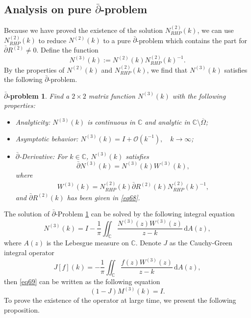 \documentclass[11pt]{article}
\numberwithin{equation}{section}
\newtheorem{dbar}{$\bar{\partial}$-problem}
\begin{document}
\subsection{\texorpdfstring{Analysis on pure $\bar{\partial}$-problem}{Analysis on pure dbar-problem}}\label{sec4.4}
Because we have proved the existence of the solution  $N^{(2)}_{RHP}(k)$,  we can use $N^{(2)}_{RHP}(k)$ to reduce $N^{(2)}(k)$ to a pure $\bar{\partial}$-problem which contains the part for $\bar\partial R^{(2)}\neq0$.
Define the function
            \begin{equation}\label{eq67}
                N^{(3)}(k):=N^{(2)}(k)N^{(2)}_{RHP}(k)^{-1}.
            \end{equation}
            By the properties of $N^{(2)}(k)$ and $N^{(2)}_{RHP}(k)$, we find that $N^{(3)}(k)$ satisfies the following $\bar{\partial}$-problem.
\begin{dbar}\label{dbar2}
    Find  a $2\times2$ matrix function $N^{(3)}(k)$ with the following properties:
            \begin{itemize}
                \item Analyticity:  $N^{(3)}(k)$ is continuous in $\mathbb{C}$ and analytic in $\mathbb{C}  \setminus \overline{\Omega}$;
                \item  Asymptotic behavior:  $N^{(3)}(k)=I+\mathcal{O}(k^{-1}), \quad k\to  \infty$;	

                \item $\bar\partial$-Derivative: For $k\in \mathbb{C}$,  $N^{(3)}(k)$ satisfies
                \begin{equation}
                    \bar{\partial} N^{(3)}(k) = N^{(3)}(k) W^{(3)}(k), \nonumber
                \end{equation}
                where
	\begin{align*}
	W^{(3)}(k)=N^{(2)}_{RHP}(k) \bar{\partial} R^{(2)}(k)N^{(2)}_{RHP}(k)^{-1},
	\end{align*}
 and  $ \bar{\partial}  R^{(2)}(k)$ has been given in \eqref{eq68}.
            \end{itemize}

\end{dbar}

The solution of $\bar{\partial}$-Problem \ref{dbar2} can be solved by the following integral equation
\begin{equation}\label{eq69}
    N^{(3)}(k) = I - \frac{1}{\pi} \iint_\mathbb{C} \frac{N^{(3)}(z) W^{(3)}(z)}{z - k} \, \mathrm{d}A(z),
\end{equation}
where $A(z)$ is the Lebesgue measure on $\mathbb{C}$. Denote $J$ as the Cauchy-Green integral operator
\begin{equation}\label{eq70}
    J\left[f\right](k) = -\frac{1}{\pi} \iint_\mathbb{C} \frac{f(z) W^{(3)}(z)}{z - k} \, \mathrm{d}A(z),
\end{equation}
then \eqref{eq69} can be written as the following equation
\begin{equation}
    (1 - J)M^{(3)}(k) = I.
\end{equation}
To prove the existence of the operator at large time, we present the following proposition.
\end{document}
